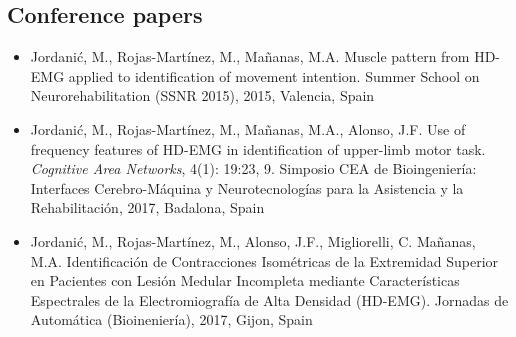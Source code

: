 \subsection{Conference papers}

\begin{itemize}
\item Jordanić, M., Rojas-Martínez, M., Mañanas, M.A. Muscle pattern from HD-EMG applied to identification of movement intention. Summer School on Neurorehabilitation (SSNR 2015), 2015, Valencia, Spain

\item   Jordanić, M., Rojas-Martínez, M., Mañanas, M.A., Alonso, J.F. Use of frequency features of HD-EMG in identification of upper-limb motor task. \textit{Cognitive Area Networks}, 4(1): 19:23, 9. Simposio CEA de Bioingeniería: Interfaces Cerebro-Máquina y Neurotecnologías para la Asistencia y la Rehabilitación, 2017, Badalona, Spain

\item Jordanić, M., Rojas-Martínez, M., Alonso, J.F., Migliorelli, C. Mañanas, M.A. Identificación de Contracciones Isométricas de la Extremidad Superior en Pacientes con Lesión Medular Incompleta mediante Características Espectrales de la Electromiografía de Alta Densidad (HD-EMG). Jornadas de Automática (Bioineniería), 2017, Gijon, Spain

\end{itemize}


